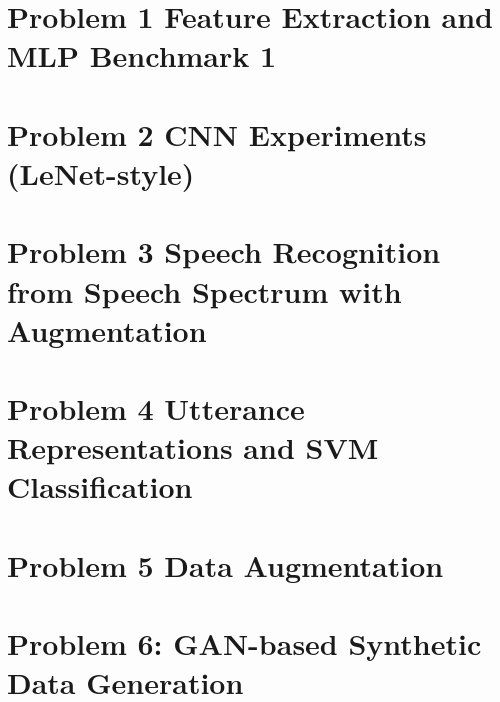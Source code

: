 \documentclass[12pt,a4paper]{article}
\begin{document}
\section{Problem 1 Feature Extraction and MLP Benchmark 1}

\newpage

\section{Problem 2 CNN Experiments (LeNet-style)}

\newpage

\section{Problem 3 Speech Recognition from Speech Spectrum with Augmentation}

\newpage

\section{Problem 4 Utterance Representations and SVM Classification}

\newpage

\section{Problem 5 Data Augmentation}

\newpage

\section{Problem 6: GAN-based Synthetic Data Generation}

\newpage
\end{document}
